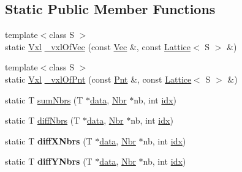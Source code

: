 \subsection*{Static Public Member Functions}
\begin{DoxyCompactItemize}
\item 
{\footnotesize template$<$class S $>$ }\\static \hyperlink{classvsr_1_1_vxl}{Vxl} \hyperlink{classvsr_1_1_lattice_ac9ed3c0ce10a532873a1781cea9c9ef2}{\-\_\-vxl\-Of\-Vec} (const \hyperlink{namespacevsr_a0d061c30ac198a710a1b92dd8b343273}{Vec} \&, const \hyperlink{classvsr_1_1_lattice}{Lattice}$<$ S $>$ \&)
\item 
{\footnotesize template$<$class S $>$ }\\static \hyperlink{classvsr_1_1_vxl}{Vxl} \hyperlink{classvsr_1_1_lattice_a93525a3a9a3ef5e28f03e028f4833074}{\-\_\-vxl\-Of\-Pnt} (const \hyperlink{namespacevsr_a2d05beb9721c5d9211b479af6d47222d}{Pnt} \&, const \hyperlink{classvsr_1_1_lattice}{Lattice}$<$ S $>$ \&)
\item 
static T \hyperlink{classvsr_1_1_lattice_aaaaea2ca6c996e8c2f7107a0cc25b61b}{sum\-Nbrs} (T $\ast$\hyperlink{classvsr_1_1_lattice_ac59d9a773db6eaca5875c270325ed407}{data}, \hyperlink{classvsr_1_1_nbr}{Nbr} $\ast$nb, int \hyperlink{classvsr_1_1_lattice_adb69198162bacf492faea0ceff8e497c}{idx})
\item 
static T \hyperlink{classvsr_1_1_lattice_a88ecc6cd8bbe34408d337c5046c42ec5}{diff\-Nbrs} (T $\ast$\hyperlink{classvsr_1_1_lattice_ac59d9a773db6eaca5875c270325ed407}{data}, \hyperlink{classvsr_1_1_nbr}{Nbr} $\ast$nb, int \hyperlink{classvsr_1_1_lattice_adb69198162bacf492faea0ceff8e497c}{idx})
\item 
\hypertarget{classvsr_1_1_lattice_a578bb7edb9df3f18a1db3350ce53dec7}{static T {\bfseries diff\-X\-Nbrs} (T $\ast$\hyperlink{classvsr_1_1_lattice_ac59d9a773db6eaca5875c270325ed407}{data}, \hyperlink{classvsr_1_1_nbr}{Nbr} $\ast$nb, int \hyperlink{classvsr_1_1_lattice_adb69198162bacf492faea0ceff8e497c}{idx})}\label{classvsr_1_1_lattice_a578bb7edb9df3f18a1db3350ce53dec7}

\item 
\hypertarget{classvsr_1_1_lattice_a00242f5bcdb60a1aceff30b76ce738d2}{static T {\bfseries diff\-Y\-Nbrs} (T $\ast$\hyperlink{classvsr_1_1_lattice_ac59d9a773db6eaca5875c270325ed407}{data}, \hyperlink{classvsr_1_1_nbr}{Nbr} $\ast$nb, int \hyperlink{classvsr_1_1_lattice_adb69198162bacf492faea0ceff8e497c}{idx})}\label{classvsr_1_1_lattice_a00242f5bcdb60a1aceff30b76ce738d2}


\end{DoxyCompactItemize}
